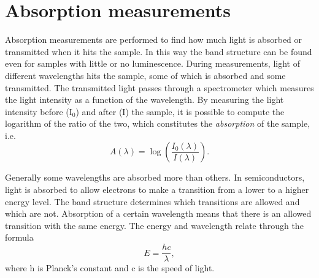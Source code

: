 	
\section{Absorption measurements}
\label{sec:absorption}
Absorption measurements are performed to find how much light is absorbed or transmitted when it hits the sample. In this way the band structure can be found even for samples with little or no luminescence. During measurements, light of different wavelengths  hits the sample, some of which is absorbed and some transmitted. The transmitted light passes through a spectrometer which measures the light intensity as a function of the wavelength. By measuring the light intensity before (I$_0$) and after (I) the sample, it is possible to compute the logarithm of the ratio of the two, which constitutes the \emph{absorption} of the sample, i.e.
\begin{equation}
\label{eq:Abs}
A(\lambda) = \log\left(\frac{I_0(\lambda)}{I(\lambda)}\right).
\end{equation}


Generally some wavelengths are absorbed more than others. In semiconductors, light is absorbed to allow electrons to make a transition from a lower to a higher energy level. The band structure determines which transitions are allowed and which are not. Absorption of a certain wavelength means that there is an allowed transition with the same energy. The energy and wavelength relate through the formula
\begin{equation}
E = \frac{hc}{\lambda},
\end{equation}
where h is Planck's constant and c is the speed of light. 


